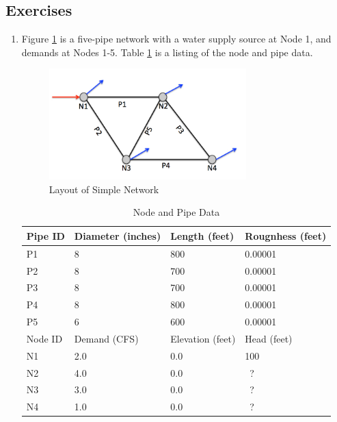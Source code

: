 \subsection{Exercises}
\begin{enumerate}
\item Figure \ref{fig:NetworkLayout} is a five-pipe network with a water supply source at Node 1, and demands at Nodes 1-5.
Table \ref{tab:PipeData} is a listing of the node and pipe data.

\begin{figure}[h!] %
\centering
   \includegraphics[width=3in]{./8-PipeNetworkHydraulics/NetworkLayout.jpg}
   \caption{Layout of Simple Network}
   \label{fig:NetworkLayout} 
\end{figure}

\begin{table}[htbp]
   \centering
   \caption{Node and Pipe Data}
    \begin{tabular}{p{1in} p{1in} p{1in} p{1in} } %
    \hline
    \hline
Pipe ID & Diameter (inches) & Length (feet) & Rougnhess (feet) \\
\hline
P1 & 8 & 800 & 0.00001  \\
P2 & 8 & 700 & 0.00001  \\
P3 & 8 & 700 & 0.00001  \\
P4 & 8 & 800 & 0.00001  \\
P5 & 6 & 600 & 0.00001  \\
\hline
\hline
Node ID & Demand (CFS) & Elevation (feet) & Head (feet) \\
\hline
N1 & 2.0 & 0.0 & 100 \\
N2 & 4.0 & 0.0 & ~? \\
N3 & 3.0 & 0.0 & ~? \\
N4 & 1.0 & 0.0 & ~? \\
   \end{tabular}
   \label{tab:PipeData}
\end{table}


\end{enumerate}
